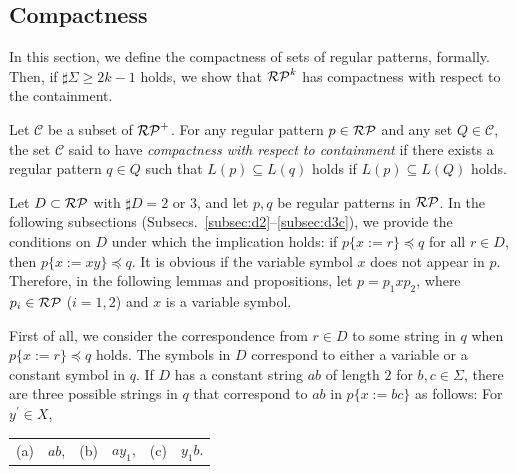 \subsection{Compactness}\label{subsec:compactness}

In this section, we define the compactness of sets of regular patterns, formally.
Then, if $\sharp\Sigma \ge 2k-1$ holds, 
we show that 
$\mathcal{RP}^{k}$ has compactness with respect to the containment.

\begin{dfn}\label{def:compactness}
Let $\mathcal{C}$ be a subset of $\mathcal{RP}^{+}$. 
For any regular pattern $p \in \mathcal{RP}$ and any set $Q \in \mathcal{C}$,
the set $\mathcal{C}$ said to have {\it compactness with respect to containment}
if there exists a regular pattern $q \in Q$ such that $L(p) \subseteq L(q)$ holds if $L(p) \subseteq L(Q)$ holds.
\end{dfn}

Let $D \subset \mathcal{RP}$ with $\sharp D = 2$ or $3$, and let $p,q$ be regular patterns in $\mathcal{RP}$.
In the following subsections (Subsecs.~\ref{subsec:d2}--\ref{subsec:d3c}), we provide the conditions on $D$ under which the implication holds: if $p \{ x := r \} \preceq q$ for all $r \in D$, then $p \{ x := xy \} \preceq q$.
It is obvious if the variable symbol $x$ does not appear in $p$.
Therefore, in the following lemmas and propositions, let $p=p_{1}xp_{2}$, where $p_{i}\in \mathcal{RP}$ ($i=1,2$) and $x$ is a variable symbol.

First of all, we consider the correspondence from $r\in D$ to some string in $q$ when $p \{ x := r \} \preceq q$ holds.
The symbols in $D$ correspond to either a variable or a constant symbol in $q$.
If $D$ has a constant string $ab$ of length $2$ for $b,c\in\Sigma$, there are three possible strings in $q$ that correspond to $ab$ in $p\{x:=bc\}$ as follows: For $y^{\prime} \in X$,
  \begin{center}
    \begin{tabular}{cccccc}
      \textrm{(a)} & $ab$, & \textrm{(b)} & $ay_{1}$, & \textrm{(c)} & $y_{1}b$.
    \end{tabular}
  \end{center}

